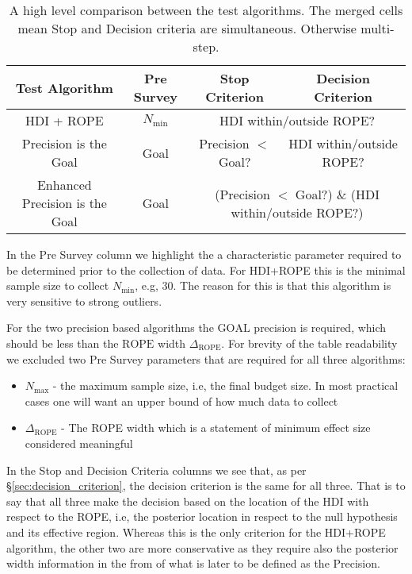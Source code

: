 \begin{table}[h!]\label{tab:table1}
    \begin{center}
      \begin{tabular}{c|c|c|c}
        \textbf{Test Algorithm } & \textbf{Pre Survey} & \textbf{Stop Criterion} &  \textbf{Decision Criterion}\\
        \hline
        HDI + ROPE & $N_\mathrm{min}$  & \multicolumn{2}{c}{\multirow{1}{*}{HDI within/outside ROPE?}}  \\
        Precision is the Goal & Goal & Precision $<$ Goal? & HDI within/outside ROPE? \\
        Enhanced Precision is the Goal & Goal& \multicolumn{2}{c}{\multirow{1}{*}{(Precision $<$ Goal?) \& (HDI within/outside ROPE?)}}  \\
      \end{tabular}
      \caption{A high level comparison between the test algorithms.
      The merged cells mean Stop and Decision criteria are simultaneous.
      Otherwise multi-step.
      }
    \end{center}
  \end{table}

In the Pre Survey column we highlight the a characteristic parameter required to be
determined prior to the collection of data. For HDI+ROPE this is the minimal sample size
to collect $N_\mathrm{min}$, e.g, 30. The reason for this is that this algorithm
is very sensitive to strong outliers.

For the two precision based algorithms the $\mathrm{GOAL}$ precision is required,
which should be less than the $\mathrm{ROPE}$ width $\Delta_\mathrm{ROPE}$. For brevity of the table
readability we excluded two Pre Survey parameters that are required for all three
algorithms:
\begin{itemize}
    \item $N_\mathrm{max}$ - the maximum sample size, i.e, the final budget size. In most practical cases one will want an upper bound of how much data to collect
    \item $\Delta_\mathrm{ROPE}$ - The ROPE width which is a statement of minimum effect size considered meaningful
\end{itemize}

In the Stop and Decision Criteria columns we see that,
as per \S\ref{sec:decision_criterion}, the decision criterion is the same
for all three. That is to say that all three make the decision based on the
location of the HDI with respect to the ROPE, i.e, the posterior location in respect
to the null hypothesis and its effective region.
Whereas this is the only criterion for the HDI+ROPE algorithm, the other two
are more conservative as they require also the posterior width information in the from
of what is later to be defined as the Precision.


